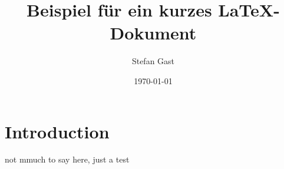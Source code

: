 \documentclass{scrartcl}
\title{Beispiel für ein kurzes \LaTeX-Dokument}
\author{Stefan Gast}
\date{\today}
\begin{document}


	\section{Introduction}
		not mmuch to say here, just a test
	
\end{document}
